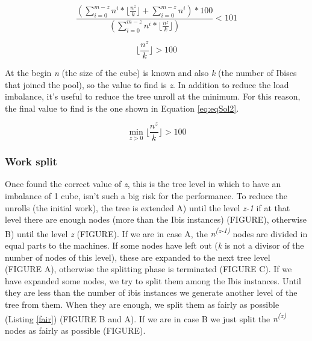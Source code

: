 \documentclass[a4paper]{article}
\begin{document}
\begin{equation} 
\label{eq:eqIne}
\frac{(\sum_{i=0}^{m-z}{n^i}*\lfloor\frac{n^z}{k}\rfloor +  \sum_{i=0}^{m-z}{n^i})*100}{(\sum_{i=0}^{m-z}{n^i}*\lfloor\frac{n^z}{k}\rfloor)} < 101
\end{equation}
\FloatBarrier

\begin{equation} 
\label{eq:eqSol}
\lfloor\frac{n^z}{k}\rfloor > 100
\end{equation}
\FloatBarrier

At the begin \textit{n} (the size of the cube) is known and also \textit{k} (the number of Ibises that joined the pool), so the value to find is \textit{z}. In addition to reduce the load imbalance, it's useful to reduce the tree unroll at the minimum. For this reason, the final value to find is the one shown in Equation \ref{eq:eqSol2}.

\begin{equation} 
\label{eq:eqSol2}
\min_{z>0} \lfloor\frac{n^z}{k}\rfloor > 100
\end{equation}
\FloatBarrier

\subsubsection{Work split}
\label{sec:ws}

Once found the correct value of \textit{z}, this is the tree level in which to have an imbalance of 1 cube, isn't such a big risk for the performance. 
To reduce the unrolls (the initial work), the tree is extended A) until the level \textit{z-1} if at that level there are enough nodes (more than the Ibis instances) (FIGURE), otherwise B) until the level \textit{z} (FIGURE). If we are in case A, the \textit{n\textsuperscript{(z-1)}} nodes are divided in equal parts to the machines. If some nodes have left out (\textit{k} is not a divisor of the number of nodes of this level), these are expanded to the next tree level (FIGURE A), otherwise the splitting phase is terminated (FIGURE C). If we have expanded some nodes, we try to split them among the Ibis instances. Until they are less than the number of ibis instances we generate another level of the tree from them. When they are enough, we split them as fairly as possible (Listing \ref{fair}) (FIGURE B and A). If we are in case B we just split the \textit{n\textsuperscript{(z)}} nodes as fairly as possible (FIGURE).
\end{document}
